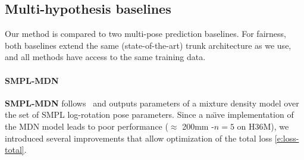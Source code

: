 

\subsection{Multi-hypothesis baselines} \label{s:multi_baselines}

Our method is compared to two multi-pose prediction baselines. For fairness, both baselines extend the same (state-of-the-art) trunk architecture as we use, and all methods have access to the same training data. 


\paragraph{SMPL-MDN}

\textbf{SMPL-MDN} follows~\cite{li19generating} and outputs parameters of a mixture density model over the set of SMPL log-rotation pose parameters. 
Since a na\"{\i}ve implementation of the MDN model leads to poor performance ($\approx$ 200mm \MPJPE-$n=5$ on H36M), we introduced several improvements that allow optimization of the total loss \cref{e:loss-total}.


